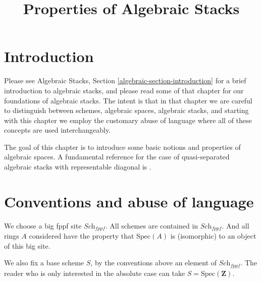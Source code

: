

%


\title{Properties of Algebraic Stacks}


\maketitle

\label{section-phantom}

\tableofcontents

\section{Introduction}
\label{section-introduction}

\noindent
Please see
Algebraic Stacks, Section \ref{algebraic-section-introduction}
for a brief introduction to algebraic stacks, and please read
some of that chapter for our foundations of algebraic stacks.
The intent is that in that chapter we are careful to distinguish
between schemes, algebraic spaces, algebraic stacks, and starting
with this chapter we employ the customary abuse of language where
all of these concepts are used interchangeably.

\medskip\noindent
The goal of this chapter is to introduce some basic notions and
properties of algebraic spaces. A fundamental
reference for the case of quasi-separated algebraic stacks with representable
diagonal is \cite{LM-B}.



\section{Conventions and abuse of language}
\label{section-conventions}

\noindent
We choose a big fppf site $\textit{Sch}_{fppf}$.
All schemes are contained in $\textit{Sch}_{fppf}$.
And all rings $A$ considered have the property that
$\text{Spec}(A)$ is (isomorphic) to an object of this big site.

\medskip\noindent
We also fix a base scheme $S$, by the conventions above an element
of $\textit{Sch}_{fppf}$. The reader who is only interested
in the absolute case can take $S = \text{Spec}(\mathbf{Z})$.

